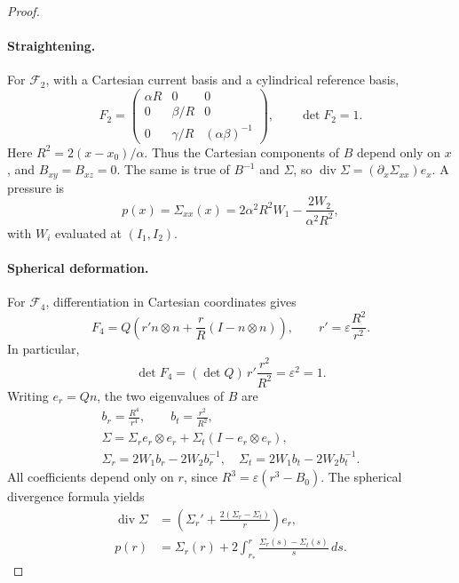 \documentclass[11pt,a4paper]{article}
\numberwithin{equation}{section}
\theoremstyle{plain}
\theoremstyle{definition}
\theoremstyle{remark}
\begin{document}
\begin{proof}
\paragraph{Straightening.}
For $\mathcal F_2$, with a Cartesian current basis and a cylindrical
reference basis,
\begin{equation}\label{suff:straightening-gradient}
 F_2=
 \begin{pmatrix}
 \alpha R&0&0\\
 0&\beta/R&0\\
 0&\gamma/R&(\alpha\beta)^{-1}
 \end{pmatrix},\qquad \det F_2=1.
\end{equation}
Here $R^2=2(x-x_0)/\alpha$.  Thus the Cartesian components of $B$ depend only
on $x$, and $B_{xy}=B_{xz}=0$.  The same is true of $B^{-1}$ and $\Sigma$,
so $\operatorname{div}\Sigma=(\partial_x \Sigma_{xx})e_x$.  A pressure is
\begin{equation}\label{suff:straightening-pressure}
 p(x)=\Sigma_{xx}(x)
     =2\alpha^2R^2W_1-\frac{2W_2}{\alpha^2R^2},
\end{equation}
with $W_i$ evaluated at $(I_1,I_2)$.

\paragraph{Spherical deformation.}
For $\mathcal F_4$, differentiation in Cartesian coordinates gives
\begin{equation}\label{suff:spherical-gradient}
 F_4=Q\left(r'n\otimes n+\frac rR(I-n\otimes n)\right),
 \qquad r'=\varepsilon\frac{R^2}{r^2}.
\end{equation}
In particular,
\begin{equation}\label{suff:spherical-jacobian}
 \det F_4=(\det Q)\,r'\frac{r^2}{R^2}
         =\varepsilon^2=1 .
\end{equation}
Writing $e_r=Qn$, the two eigenvalues of $B$ are
\begin{equation}\label{suff:spherical-stress}
 \begin{gathered}
 b_r=\frac{R^4}{r^4},\qquad b_t=\frac{r^2}{R^2},\\
 \Sigma=\Sigma_r e_r\otimes e_r+\Sigma_t(I-e_r\otimes e_r),\\
 \Sigma_r=2W_1b_r-2W_2b_r^{-1},\quad
 \Sigma_t=2W_1b_t-2W_2b_t^{-1}.
 \end{gathered}
\end{equation}
All coefficients depend only on $r$, since
$R^3=\varepsilon(r^3-B_0)$.  The spherical divergence formula yields
\begin{equation}\label{suff:spherical-pressure}
 \begin{aligned}
 \operatorname{div}\Sigma
  &=\left(\Sigma_r'+\frac{2(\Sigma_r-\Sigma_t)}r\right)e_r,\\
 p(r)&=\Sigma_r(r)+2\int_{r_*}^{r}\frac{\Sigma_r(s)-\Sigma_t(s)}s\,ds .
 \end{aligned}
\end{equation}


\end{proof}
\end{document}

